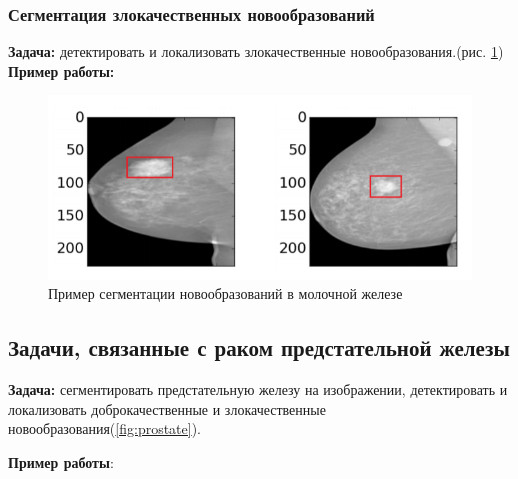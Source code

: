 \subsubsection{Сегментация злокачественных новообразований}

{\bf Задача:} детектировать и локализовать злокачественные новообразования.(рис. \ref{fig:breast_3})
\\
{\bf Пример работы:} \cite{zhu_mil}

\begin{figure}[h] 
  \center
  \includegraphics [scale=0.8] {images/breast_cancer.png}
  \caption{ Пример сегментации новообразований в молочной железе\cite{zhu_mil} }
  \label{fig:breast_3}  
\end{figure}



\subsection{Задачи, связанные с раком предстательной железы}

{\bf Задача:} сегментировать предстательную железу на изображении, детектировать и локализовать доброкачественные и  злокачественные новообразования(\ref{fig:prostate}).

{\bf Пример работы}: \cite{prostate-cancer}

